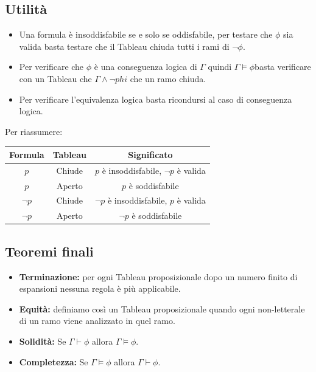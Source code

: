 \documentclass[../main.tex]{subfiles}
\begin{document}
    \subsection{Utilità}
    \begin{itemize}
        \item Una formula è insoddisfabile se e solo se oddisfabile, per testare che $\phi$ sia valida basta testare che il Tableau chiuda tutti i rami di $\lnot \phi$.
        \item Per verificare che $\phi$ è una conseguenza logica di $\Gamma$ quindi $\Gamma \models \phi$basta verificare con un Tableau che $\Gamma \land \lnot phi$ che un ramo chiuda.
        \item Per verificare l'equivalenza logica basta ricondursi al caso di conseguenza logica.
    \end{itemize}
    Per riassumere:
    \begin{center}
        \begin{tabular}{|c|c|c|}
            \hline
            Formula & Tableau & Significato\\
            \hline
            $p$ & Chiude & $p$ è insoddisfabile, $\lnot p$ è valida\\
            \hline
            $p$ & Aperto & $p$ è soddisfabile\\
            \hline
            $\lnot p$ & Chiude & $\lnot p$ è insoddisfabile, $p$ è valida\\
            \hline
            $\lnot p$ & Aperto & $\lnot p$ è soddisfabile\\
            \hline
        \end{tabular}
    \end{center}

    \subsection{Teoremi finali}
    \begin{itemize}
        \item \textbf{Terminazione:} per ogni Tableau proposizionale dopo un numero finito di espansioni nessuna regola è più applicabile.
        \item \textbf{Equità:} definiamo così un Tableau proposizionale quando ogni non-letterale di un ramo viene analizzato in quel ramo.
        \item \textbf{Solidità:} Se $\Gamma \vdash \phi$ allora $\Gamma \models \phi$.
        \item \textbf{Completezza:} Se $\Gamma \models \phi$ allora $\Gamma \vdash \phi$.
    \end{itemize}
\end{document}

